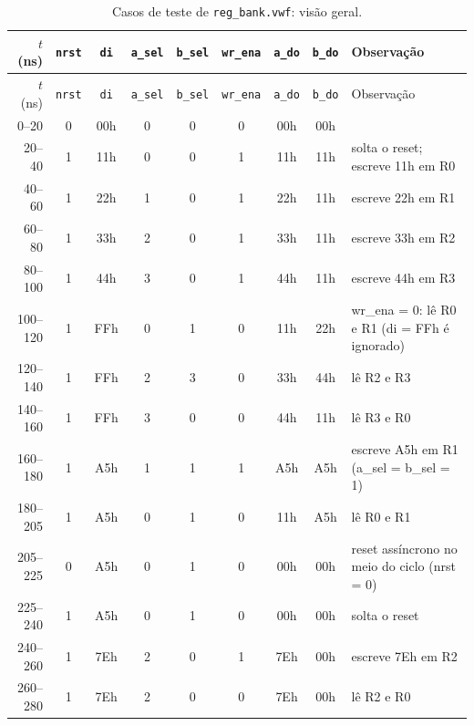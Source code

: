 {\scriptsize\setlength{\tabcolsep}{3pt}
\begin{longtable}{rcccccccp{5.3cm}}
\caption{Casos de teste de \texttt{reg\_bank.vwf}: visão geral.}
\label{tab:caso-reg-bank}\\
\hline $t$ (ns) & \texttt{nrst} & \texttt{di} & \texttt{a\_sel} & \texttt{b\_sel} & \texttt{wr\_ena} & \texttt{a\_do} & \texttt{b\_do} & Observação \\ \hline \endfirsthead
\hline $t$ (ns) & \texttt{nrst} & \texttt{di} & \texttt{a\_sel} & \texttt{b\_sel} & \texttt{wr\_ena} & \texttt{a\_do} & \texttt{b\_do} & Observação \\ \hline \endhead
0--20 & 0 & 00h & 0 & 0 & 0 & 00h & 00h &  \\
20--40 & 1 & 11h & 0 & 0 & 1 & 11h & 11h & solta o reset; escreve 11h em R0 \\
40--60 & 1 & 22h & 1 & 0 & 1 & 22h & 11h & escreve 22h em R1 \\
60--80 & 1 & 33h & 2 & 0 & 1 & 33h & 11h & escreve 33h em R2 \\
80--100 & 1 & 44h & 3 & 0 & 1 & 44h & 11h & escreve 44h em R3 \\
100--120 & 1 & FFh & 0 & 1 & 0 & 11h & 22h & wr\_ena = 0: lê R0 e R1 (di = FFh é ignorado) \\
120--140 & 1 & FFh & 2 & 3 & 0 & 33h & 44h & lê R2 e R3 \\
140--160 & 1 & FFh & 3 & 0 & 0 & 44h & 11h & lê R3 e R0 \\
160--180 & 1 & A5h & 1 & 1 & 1 & A5h & A5h & escreve A5h em R1 (a\_sel = b\_sel = 1) \\
180--205 & 1 & A5h & 0 & 1 & 0 & 11h & A5h & lê R0 e R1 \\
205--225 & 0 & A5h & 0 & 1 & 0 & 00h & 00h & reset assíncrono no meio do ciclo (nrst = 0) \\
225--240 & 1 & A5h & 0 & 1 & 0 & 00h & 00h & solta o reset \\
240--260 & 1 & 7Eh & 2 & 0 & 1 & 7Eh & 00h & escreve 7Eh em R2 \\
260--280 & 1 & 7Eh & 2 & 0 & 0 & 7Eh & 00h & lê R2 e R0 \\
\hline
\end{longtable}}
\vspace{-0.9cm}
